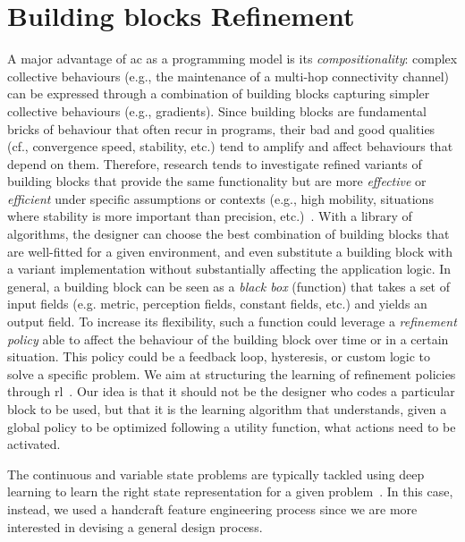 \section{Building blocks Refinement}\label{coordination2022:s:learning-gradient}
A major advantage of \ac{ac} as a programming model is its \emph{compositionality}: complex collective behaviours (e.g., the maintenance of a multi-hop connectivity channel) can be expressed through a combination of building blocks capturing simpler collective behaviours (e.g., gradients).
%
Since building blocks are fundamental bricks of behaviour that often recur in programs, 
 their bad and good qualities (cf., convergence speed, stability, etc.) tend to amplify and affect behaviours that depend on them.
%
Therefore, research tends to investigate refined variants of building blocks that provide the same functionality but are more \emph{effective} or \emph{efficient} under specific assumptions or contexts (e.g., high mobility, situations where stability is more important than precision, etc.)~\cite{DBLP:conf/saso/AudritoCDV17,DBLP:journals/cee/AudritoCDPV21}.
%
With a library of algorithms, 
 the designer can choose the best combination of building blocks that are well-fitted for a given environment, 
 and even substitute a building block with a variant implementation without substantially affecting the application logic.
In general, a building block can be seen as a \emph{black box} (function) that takes a set of input fields (e.g. metric, perception fields, constant fields, etc.) and yields an output field. 
%
To increase its flexibility, 
 such a function could leverage a \emph{refinement policy} able to affect the behaviour of the building block over time or in a certain situation. 
%
This policy could be a feedback loop, hysteresis, or custom logic to solve a specific problem.
%
We aim at structuring the learning of refinement policies through \ac{rl}~\cite{DBLP:conf/acsos/Aguzzi21}.
%
Our idea is that it should not be the designer who codes a particular block to be used, 
 but that it is the learning algorithm that understands, given a global policy to be optimized following a utility function, 
 what actions need to be activated.



The continuous and variable state problems are typically tackled using deep learning to learn the right state representation for a given problem~\cite{DBLP:journals/corr/abs-1806-08894}. %
%
In this case, instead, we used a handcraft feature engineering process since we are more interested in devising a general design process.

